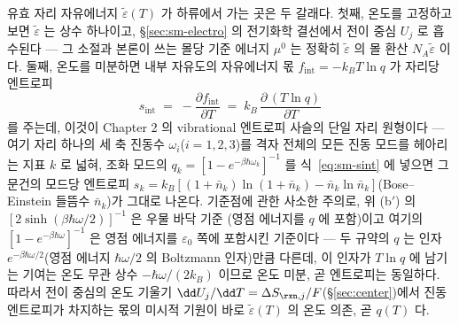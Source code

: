 유효 자리 자유에너지 $\tilde\varepsilon(T)$ 가 하류에서 가는 곳은 두 갈래다. 첫째, 온도를 고정하고 보면
$\tilde\varepsilon$ 는 상수 하나이고, \S\ref{sec:sm-electro} 의 전기화학 결선에서 전이 중심 $U_j$ 로
흡수된다 --- 그 소절과 본론이 쓰는 몰당 기준 에너지 $\mu^0$ 는 정확히 $\tilde\varepsilon$ 의 몰 환산
$N_A\tilde\varepsilon$ 이다. 둘째, 온도를 미분하면 내부 자유도의 자유에너지 몫
$f_\mathrm{int}=-k_BT\ln q$ 가 자리당 엔트로피
\begin{equation}
s_\mathrm{int}\;=\;-\frac{\partial f_\mathrm{int}}{\partial T}
\;=\;k_B\,\frac{\partial\,(T\ln q)}{\partial T}
\label{eq:sm-sint}
\end{equation}
를 주는데, 이것이 Chapter 2 의 vibrational 엔트로피 사슬의 단일 자리 원형이다 --- 여기 자리 하나의
세 축 진동수 $\omega_i$($i=1,2,3$)를 격자 전체의 모든 진동 모드를 헤아리는 지표 $k$ 로 넓혀, 조화 모드의
$q_k=[1-e^{-\beta\hbar\omega_k}]^{-1}$ 를 식~\eqref{eq:sm-sint} 에 넣으면 그 문건의 모드당 엔트로피
$s_k=k_B[(1+\bar n_k)\ln(1+\bar n_k)-\bar n_k\ln\bar n_k]$(Bose--Einstein 들뜸수 $\bar n_k$)가 그대로
나온다. 기준점에 관한 사소한 주의로, 위 (b$'$) 의 $[2\sinh(\beta\hbar\omega/2)]^{-1}$ 은 우물 바닥 기준
(영점 에너지를 $q$ 에 포함)이고 여기의 $[1-e^{-\beta\hbar\omega}]^{-1}$ 은 영점 에너지를
$\varepsilon_0$ 쪽에 포함시킨 기준이다 --- 두 규약의 $q$ 는 인자 $e^{-\beta\hbar\omega/2}$(영점 에너지
$\hbar\omega/2$ 의 Boltzmann 인자)만큼 다른데, 이 인자가 $T\ln q$ 에 남기는 기여는 온도 무관 상수
$-\hbar\omega/(2k_B)$ 이므로 온도 미분, 곧 엔트로피는 동일하다. 따라서 전이 중심의 온도 기울기
$\dd U_j/\dd T=\Delta S_{\rxn,j}/F$(\S\ref{sec:center})에서 진동
엔트로피가 차지하는 몫의 미시적 기원이 바로 $\tilde\varepsilon(T)$ 의 온도 의존, 곧 $q(T)$ 다.

